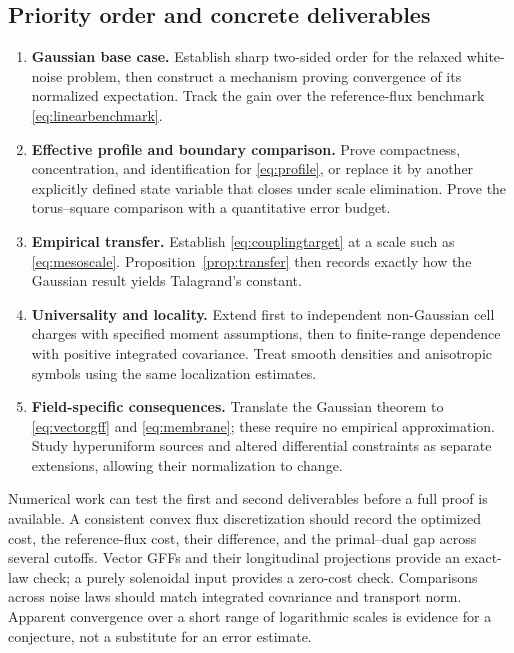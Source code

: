 \documentclass[11pt]{article}
\theoremstyle{definition}
\begin{document}
\subsection{Priority order and concrete deliverables}
\begin{enumerate}[label=\textbf{\arabic*.}]
  \item \textbf{Gaussian base case.} Establish sharp two-sided order
  for the relaxed white-noise problem, then construct a mechanism
  proving convergence of its normalized expectation. Track the gain
  over the reference-flux benchmark \eqref{eq:linearbenchmark}.
  \item \textbf{Effective profile and boundary comparison.} Prove
  compactness, concentration, and identification for
  \eqref{eq:profile}, or replace it by another explicitly defined
  state variable that closes under scale elimination. Prove the
  torus--square comparison with a quantitative error budget.
  \item \textbf{Empirical transfer.} Establish
  \eqref{eq:couplingtarget} at a scale such as \eqref{eq:mesoscale}.
  Proposition~\ref{prop:transfer} then records exactly how the
  Gaussian result yields Talagrand's constant.
  \item \textbf{Universality and locality.} Extend first to independent
  non-Gaussian cell charges with specified moment assumptions, then
  to finite-range dependence with positive integrated covariance.
  Treat smooth densities and anisotropic symbols using the same
  localization estimates.
  \item \textbf{Field-specific consequences.} Translate the Gaussian
  theorem to \eqref{eq:vectorgff} and \eqref{eq:membrane}; these require
  no empirical approximation. Study hyperuniform sources and altered
  differential constraints as separate extensions, allowing their
  normalization to change.
\end{enumerate}

Numerical work can test the first and second deliverables before a full
proof is available. A consistent convex flux discretization should
record the optimized cost, the reference-flux cost, their difference,
and the primal--dual gap across several cutoffs. Vector GFFs and their
longitudinal projections provide an exact-law check; a purely
solenoidal input provides a zero-cost check. Comparisons across noise
laws should match integrated covariance and transport norm. Apparent
convergence over a short range of logarithmic scales is evidence for
a conjecture, not a substitute for an error estimate.
\end{document}
